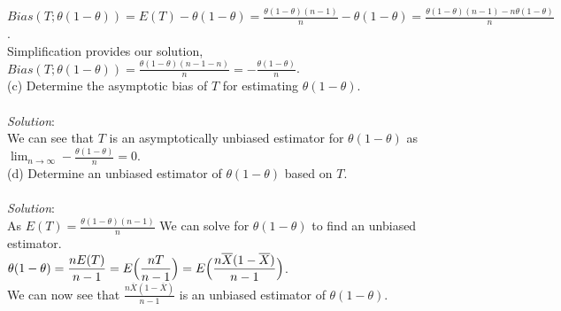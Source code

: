 \documentclass[12pt]{article}
\newcommand{\XB}{\color{black}}
\newcommand{\XBB}{\color{blue}}
\begin{document}
\noindent 
$ \displaystyle Bias(T; \theta(1 - \theta)) = E(T) - \theta(1 - \theta) = \frac{\theta(1 - \theta)(n - 1)}{n} - \theta(1 - \theta) = \frac{\theta(1 - \theta)(n - 1) - n\theta(1 - \theta)}{n} $. \\

\noindent
Simplification provides our solution, $ \displaystyle Bias(T; \theta(1 - \theta)) = \frac{\theta(1 - \theta)(n - 1 - n)}{n} = -\frac{\theta(1 - \theta)}{n} $. \\


(c) Determine the asymptotic bias of $ T $ for estimating $ \theta(1 - \theta) $. \\
\vspace{2.5mm} \\
\textit{Solution}:
\vspace{2.5mm} \\

\noindent 
We can see that $ T $ is an asymptotically unbiased estimator for $ \theta(1 - \theta) $ as $ \displaystyle \lim_{n \to \infty} -\frac{\theta(1 - \theta)}{n} = 0 $. \\


(d) Determine an unbiased estimator of $ \theta(1 - \theta) $ based on $ T $. \\
\vspace{2.5mm} \\
\textit{Solution}:
\vspace{2.5mm} \\

\noindent 
As $ \displaystyle E(T) = \frac{\theta(1 - \theta)(n - 1)}{n} $ We can solve for $ \theta(1 - \theta) $ to find an unbiased estimator. \\

$ \displaystyle \theta(1 - \theta) = \frac{nE(T)}{n - 1} = E\Bigl( \frac{nT}{n - 1} \Bigr) = E\Bigl( \frac{n\overline{X}(1 - \overline{X})}{n - 1} \Bigr) $. \\

\noindent
We can now see that $ \displaystyle \frac{n\overline{X}(1 - \overline{X})}{n - 1} $ is an unbiased estimator of $ \theta(1 - \theta) $. \\

\newpage
\XBB\hrulefill\XB \\
\end{document}
